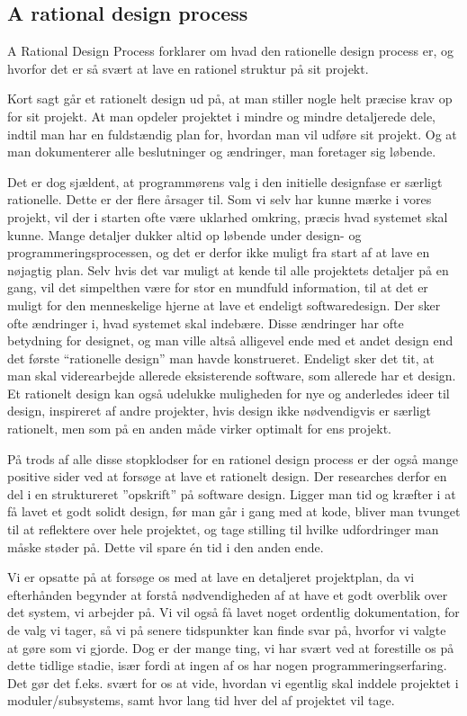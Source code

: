 \documentclass[12pt,a4paper]{article}
\begin{document}
\subsection{A rational design process}
A Rational Design Process forklarer om hvad den rationelle design process er, og hvorfor det er så svært at lave en rationel struktur på sit projekt.

Kort sagt går et rationelt design ud på, at man stiller nogle helt præcise krav op for sit projekt. At man opdeler projektet i mindre og mindre detaljerede dele, indtil man har en fuldstændig plan for, hvordan man vil udføre sit projekt. Og at man dokumenterer alle beslutninger og ændringer, man foretager sig løbende.

Det er dog sjældent, at programmørens valg i den initielle designfase er særligt rationelle. Dette er der flere årsager til. Som vi selv har kunne mærke i vores projekt, vil der i starten ofte være uklarhed omkring, præcis hvad systemet skal kunne. Mange detaljer dukker altid op løbende under design- og programmeringsprocessen, og det er derfor ikke muligt fra start af at lave en nøjagtig plan. Selv hvis det var muligt at kende til alle projektets detaljer på en gang, vil det simpelthen være for stor en mundfuld information, til at det er muligt for den menneskelige hjerne at lave et endeligt softwaredesign. Der sker ofte ændringer i, hvad systemet skal indebære. Disse ændringer har ofte betydning for designet, og man ville altså alligevel ende med et andet design end det første “rationelle design” man havde konstrueret. Endeligt sker det tit, at man skal viderearbejde allerede eksisterende software, som allerede har et design. Et rationelt design kan også udelukke muligheden for nye og anderledes ideer til design, inspireret af andre projekter, hvis design ikke nødvendigvis er særligt rationelt, men som på en anden måde virker optimalt for ens projekt.

På trods af alle disse stopklodser for en rationel design process er der også mange positive sider ved at forsøge at lave et rationelt design. Der researches derfor en del i en struktureret ”opskrift” på software design.
Ligger man tid og kræfter i at få lavet et godt solidt design, før man går i gang med at kode, bliver man tvunget til at reflektere over hele projektet, og tage stilling til hvilke udfordringer man måske støder på. Dette vil spare én tid i den anden ende.

Vi er opsatte på at forsøge os med at lave en detaljeret projektplan, da vi efterhånden begynder at forstå nødvendigheden af at have et godt overblik over det system, vi arbejder på. Vi vil også få lavet noget ordentlig dokumentation, for de valg vi tager, så vi på senere tidspunkter kan finde svar på, hvorfor vi valgte at gøre som vi gjorde. 
Dog er der mange ting, vi har svært ved at forestille os på dette tidlige stadie, især fordi at ingen af os har nogen programmeringserfaring. Det gør det f.eks. svært for os at vide, hvordan vi egentlig skal inddele projektet i moduler/subsystems, samt hvor lang tid hver del af projektet vil tage.
\end{document}
